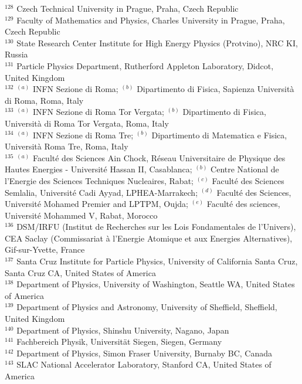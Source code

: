 \begin{flushleft}
$^{128}$ Czech Technical University in Prague, Praha, Czech Republic\\
$^{129}$ Faculty of Mathematics and Physics, Charles University in Prague, Praha, Czech Republic\\
$^{130}$ State Research Center Institute for High Energy Physics (Protvino), NRC KI, Russia\\
$^{131}$ Particle Physics Department, Rutherford Appleton Laboratory, Didcot, United Kingdom\\
$^{132}$ $^{(a)}$ INFN Sezione di Roma; $^{(b)}$ Dipartimento di Fisica, Sapienza Universit{\`a} di Roma, Roma, Italy\\
$^{133}$ $^{(a)}$ INFN Sezione di Roma Tor Vergata; $^{(b)}$ Dipartimento di Fisica, Universit{\`a} di Roma Tor Vergata, Roma, Italy\\
$^{134}$ $^{(a)}$ INFN Sezione di Roma Tre; $^{(b)}$ Dipartimento di Matematica e Fisica, Universit{\`a} Roma Tre, Roma, Italy\\
$^{135}$ $^{(a)}$ Facult{\'e} des Sciences Ain Chock, R{\'e}seau Universitaire de Physique des Hautes Energies - Universit{\'e} Hassan II, Casablanca; $^{(b)}$ Centre National de l'Energie des Sciences Techniques Nucleaires, Rabat; $^{(c)}$ Facult{\'e} des Sciences Semlalia, Universit{\'e} Cadi Ayyad, LPHEA-Marrakech; $^{(d)}$ Facult{\'e} des Sciences, Universit{\'e} Mohamed Premier and LPTPM, Oujda; $^{(e)}$ Facult{\'e} des sciences, Universit{\'e} Mohammed V, Rabat, Morocco\\
$^{136}$ DSM/IRFU (Institut de Recherches sur les Lois Fondamentales de l'Univers), CEA Saclay (Commissariat {\`a} l'Energie Atomique et aux Energies Alternatives), Gif-sur-Yvette, France\\
$^{137}$ Santa Cruz Institute for Particle Physics, University of California Santa Cruz, Santa Cruz CA, United States of America\\
$^{138}$ Department of Physics, University of Washington, Seattle WA, United States of America\\
$^{139}$ Department of Physics and Astronomy, University of Sheffield, Sheffield, United Kingdom\\
$^{140}$ Department of Physics, Shinshu University, Nagano, Japan\\
$^{141}$ Fachbereich Physik, Universit{\"a}t Siegen, Siegen, Germany\\
$^{142}$ Department of Physics, Simon Fraser University, Burnaby BC, Canada\\
$^{143}$ SLAC National Accelerator Laboratory, Stanford CA, United States of America\\

\end{flushleft}
